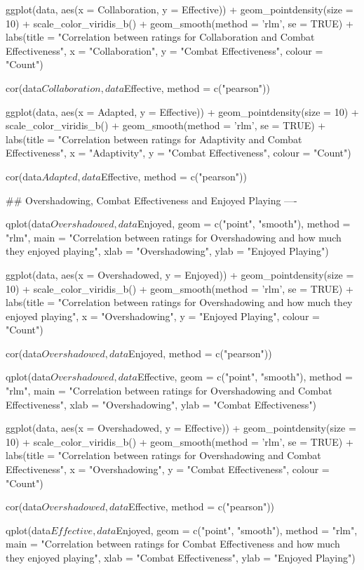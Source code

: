 \documentclass{IEEEtran}
\begin{document}
\begin{verbnobox}[\fontsize{10pt}{10pt}\selectfont]
ggplot(data, aes(x = Collaboration, y = Effective)) +
  geom_pointdensity(size = 10) +
  scale_color_viridis_b() + 
  geom_smooth(method = 'rlm', se = TRUE) +
  labs(title = "Correlation between ratings for Collaboration and Combat Effectiveness",
       x = "Collaboration", y = "Combat Effectiveness", colour = "Count")

cor(data$Collaboration, data$Effective, method = c("pearson"))

ggplot(data, aes(x = Adapted, y = Effective)) +
  geom_pointdensity(size = 10) +
  scale_color_viridis_b() + 
  geom_smooth(method = 'rlm', se = TRUE) +
  labs(title = "Correlation between ratings for Adaptivity and Combat Effectiveness",
       x = "Adaptivity", y = "Combat Effectiveness", colour = "Count")

cor(data$Adapted, data$Effective, method = c("pearson"))

## Overshadowing, Combat Effectiveness and Enjoyed Playing ----

qplot(data$Overshadowed, data$Enjoyed, geom = c("point", "smooth"), method = "rlm",
      main = "Correlation between ratings for Overshadowing and how much they enjoyed 
      playing", 
      xlab = "Overshadowing", ylab = "Enjoyed Playing")

ggplot(data, aes(x = Overshadowed, y = Enjoyed)) +
  geom_pointdensity(size = 10) +
  scale_color_viridis_b() + 
  geom_smooth(method = 'rlm', se = TRUE) +
  labs(title = "Correlation between ratings for Overshadowing and how much they enjoyed
  playing",
       x = "Overshadowing", y = "Enjoyed Playing", colour = "Count")

cor(data$Overshadowed, data$Enjoyed, method = c("pearson"))

qplot(data$Overshadowed, data$Effective, geom = c("point", "smooth"), method = "rlm",
      main = "Correlation between ratings for Overshadowing and Combat Effectiveness", 
      xlab = "Overshadowing", ylab = "Combat Effectiveness")

ggplot(data, aes(x = Overshadowed, y = Effective)) +
  geom_pointdensity(size = 10) +
  scale_color_viridis_b() + 
  geom_smooth(method = 'rlm', se = TRUE) +
  labs(title = "Correlation between ratings for Overshadowing and Combat Effectiveness",
       x = "Overshadowing", y = "Combat Effectiveness", colour = "Count")

cor(data$Overshadowed, data$Effective, method = c("pearson"))

qplot(data$Effective, data$Enjoyed, geom = c("point", "smooth"), method = "rlm",
      main = "Correlation between ratings for Combat Effectiveness and how much they enjoyed 
      playing", 
      xlab = "Combat Effectiveness", ylab = "Enjoyed Playing")


\end{verbnobox}
\end{document}
